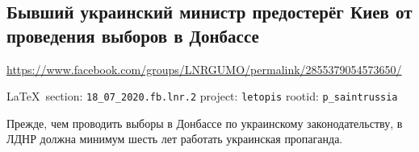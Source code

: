  
 
\subsection{Бывший украинский министр предостерёг Киев от проведения выборов в Донбассе}
\label{sec:18_07_2020.fb.lnr.2}
\url{https://www.facebook.com/groups/LNRGUMO/permalink/2855379054573650/}
  
\vspace{0.5cm}
{\small\LaTeX~section: \verb|18_07_2020.fb.lnr.2| project: \verb|letopis| rootid: \verb|p_saintrussia|}
\vspace{0.5cm}

Прежде, чем проводить выборы в Донбассе по украинскому законодательству, в ЛДНР
должна минимум шесть лет работать украинская пропаганда. 
  
